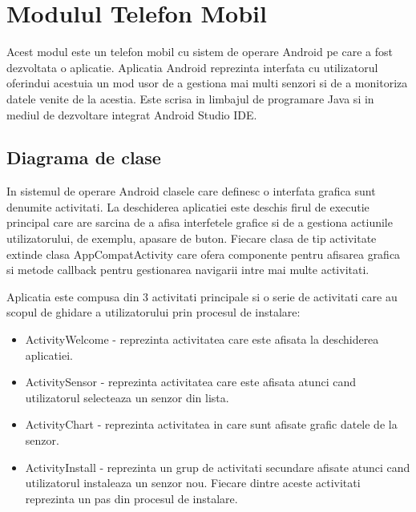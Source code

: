 \section{Modulul Telefon Mobil}\label{sec:pi_appandroid}
Acest modul este un telefon mobil cu sistem de operare Android pe care a fost dezvoltata o aplicatie. Aplicatia Android reprezinta interfata cu utilizatorul oferindui 
acestuia un mod usor de a gestiona mai multi senzori si de a monitoriza datele venite de la acestia. Este scrisa in limbajul de programare Java si in mediul de dezvoltare 
integrat Android Studio IDE.

\subsection{Diagrama de clase}\label{subsec:pi_appandroid_digrama_clase}
In sistemul de operare Android clasele care definesc o interfata grafica sunt denumite activitati. La deschiderea aplicatiei este deschis firul de executie principal 
care are sarcina de a afisa interfetele grafice si de a gestiona actiunile utilizatorului, de exemplu, apasare de buton. Fiecare clasa de tip activitate extinde 
clasa AppCompatActivity care ofera componente pentru afisarea grafica si metode callback pentru gestionarea navigarii intre mai multe activitati. 

Aplicatia este compusa din 3 activitati principale si o serie de activitati care au scopul de ghidare a utilizatorului prin procesul de instalare:
\begin{itemize}
	\item ActivityWelcome - reprezinta activitatea care este afisata la deschiderea aplicatiei.
	\item ActivitySensor - reprezinta activitatea care este afisata atunci cand utilizatorul selecteaza un senzor din lista.
	\item ActivityChart - reprezinta activitatea in care sunt afisate grafic datele de la senzor.
	\item ActivityInstall - reprezinta un grup de activitati secundare afisate atunci cand utilizatorul instaleaza un senzor nou. Fiecare dintre aceste 
	activitati reprezinta un pas din procesul de instalare.
\end{itemize}

\

